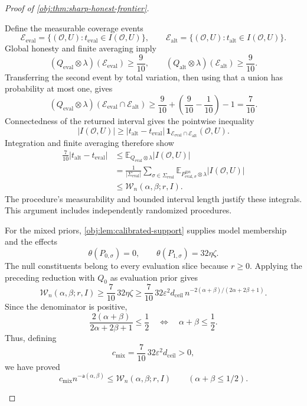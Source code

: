 \documentclass[11pt]{article}
\begin{document}
\begin{proof}[Proof of \cref{obj:thm:sharp-honest-frontier}]
\begin{enumerate}
Define the measurable coverage events
\[
\mathcal E_{\mathrm{eval}}
=\{(\mathcal O,U):t_{\mathrm{eval}}\in I(\mathcal O,U)\},
\qquad
\mathcal E_{\mathrm{alt}}
=\{(\mathcal O,U):t_{\mathrm{alt}}\in I(\mathcal O,U)\}.
\]
Global honesty and finite averaging imply
\[
(Q_{\mathrm{eval}}\otimes\lambda)(\mathcal E_{\mathrm{eval}})\ge\frac9{10},
\qquad
(Q_{\mathrm{alt}}\otimes\lambda)(\mathcal E_{\mathrm{alt}})\ge\frac9{10}.
\]
Transferring the second event by total variation, then using that a union has
probability at most one, gives
\[
(Q_{\mathrm{eval}}\otimes\lambda)
(\mathcal E_{\mathrm{eval}}\cap\mathcal E_{\mathrm{alt}})
\ge\frac9{10}+\left(\frac9{10}-\frac1{10}\right)-1
=\frac7{10}.
\]
Connectedness of the returned interval gives the pointwise inequality
\[
|I(\mathcal O,U)|
\ge
|t_{\mathrm{alt}}-t_{\mathrm{eval}}|\,
\mathbf1_{\mathcal E_{\mathrm{eval}}\cap\mathcal E_{\mathrm{alt}}}
(\mathcal O,U).
\]
Integration and finite averaging therefore show
\[
\begin{aligned}
\frac7{10}|t_{\mathrm{alt}}-t_{\mathrm{eval}}|
&\le
\mathbb E_{Q_{\mathrm{eval}}\otimes\lambda}|I(\mathcal O,U)|\\
&=
\frac1{|\Sigma_{\mathrm{eval}}|}
\sum_{\sigma\in\Sigma_{\mathrm{eval}}}
\mathbb E_{P_{\mathrm{eval},\sigma}^{\otimes n}\otimes\lambda}
|I(\mathcal O,U)|\\
&\le\mathcal W_n(\alpha,\beta;r,I).
\end{aligned}
\]
The procedure's measurability and bounded interval length justify these
integrals. This argument includes independently randomized procedures.

For the mixed priors, \cref{obj:lem:calibrated-support} supplies model
membership and the effects
\[
\theta(P_{0,\sigma})=0,\qquad
\theta(P_{1,\sigma})=32\eta\zeta.
\]
The null constituents belong to every evaluation slice because \(r\ge0\).
Applying the preceding reduction with \(Q_0\) as evaluation prior gives
\[
\mathcal W_n(\alpha,\beta;r,I)
\ge\frac7{10}\,32\eta\zeta
\ge
\frac7{10}\,32\varepsilon^2d_{\mathrm{ceil}}\,
n^{-2(\alpha+\beta)/(2\alpha+2\beta+1)}.
\]
Since the denominator is positive,
\[
\frac{2(\alpha+\beta)}{2\alpha+2\beta+1}\le\frac12
\quad\Longleftrightarrow\quad
\alpha+\beta\le\frac12.
\]
Thus, defining
\[
c_{\mathrm{mix}}=\frac7{10}\,32\varepsilon^2d_{\mathrm{ceil}}>0,
\]
we have proved
\[
c_{\mathrm{mix}}n^{-\mathsf a(\alpha,\beta)}
\le\mathcal W_n(\alpha,\beta;r,I)
\qquad(\alpha+\beta\le1/2).
\]


\end{enumerate}
\end{proof}
\end{document}
